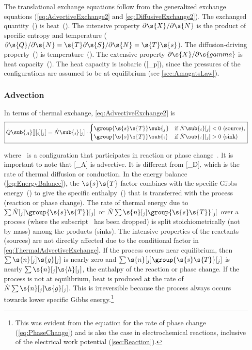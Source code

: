 The translational exchange equations follow from the generalized exchange equations (\ref{eq:AdvectiveExchange2} and \ref{eq:DiffusiveExchange2}).  The exchanged quantity~() is heat~().  The intensive property $\partial\s{X}/\partial\s{N}$ is the product of specific entropy and temperature ($\partial\s{Q}/\partial\s{N} = \s{T}\partial\s{S}/\partial\s{N} = \s{T}\s{s}$).  The diffusion-driving property~() is temperature~().  The extensive property $\partial\s{X}/\partial{\s{gamma}}$ is heat capacity~().  The heat capacity is isobaric ([_p]), since the pressures of the configurations are assumed to be at equilibrium (see \autoref{sec:AmagatsLaw}).


\subsubsection{Advection}
\label{sec:ThermalAdvectiveExchange}

In terms of thermal exchange, \autoref{eq:AdvectiveExchange2} is
\begin{equation}
  \label{eq:ThermalAdvectiveExchange}
  \boxed{\dot{Q}\sub{_A}[ ][_i][_j] = \dot{N}\sub{_i}[_j]\cdot
  \begin{cases}%
    \group{\s{s}\s{T}}\sub{_j} & \text{if $\dot{N}\sub{_i}[_j] < 0$ (source),} \\
    \group{\s{s}\s{T}}\sub{_i} & \text{if $\dot{N}\sub{_i}[_j] > 0$ (sink)}
  \end{cases}}
\end{equation}

where ~is a configuration that participates in reaction or phase change~.  It is important to note that [_A] is advective.  It is different from [_D], which is the rate of thermal diffusion or conduction.  In the energy balance (\autoref{eq:EnergyBalance}), the $\s{s}\s{T}$ factor combines with the specific Gibbs energy~() to give the specific enthalpy~() that is transferred with the process (reaction or phase change).  The rate of thermal energy due to $\sum\dot{N}[_j]\group{\s{s}\s{T}}[_j]$ or $\dot{N}\sum\s{n}[_j]\group{\s{s}\s{T}}[_j]$ over a process (where the subscript~ has been dropped) is split stoichiometrically (not by mass) among the products (sinks).  The intensive properties of the reactants (sources) are not directly affected due to the conditional factor in \autoref{eq:ThermalAdvectiveExchange}.  If the process occurs near equilibrium, then $\sum\s{n}[_j]\s{g}[_j]$ is nearly zero and $\sum\s{n}[_j]\group{\s{s}\s{T}}[_j]$ is nearly $\sum\s{n}[_j]\s{h}[_j]$, the enthalpy of the reaction or phase change.  If the process is not at equilibrium, heat is produced at the rate of $\dot{N}\sum\s{n}[_j]\s{g}[_j]$.  This is irreversible because the process always occurs towards lower specific Gibbs energy.\footnote{This was evident from the equation for the rate of phase change (\ref{eq:PhaseChange}) and is also the case in electrochemical reactions, inclusive of the electrical work potential (\autoref{sec:Reaction}).}

